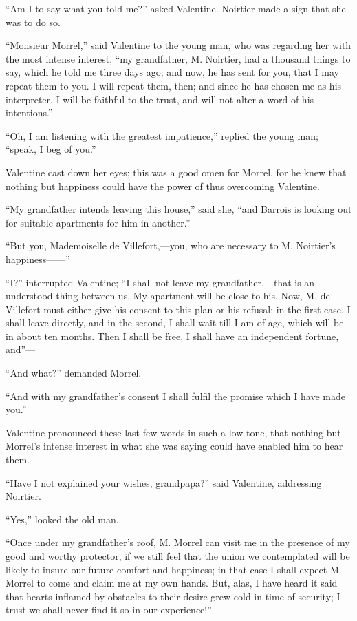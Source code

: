 “Am I to say what you told me?” asked Valentine. Noirtier made a sign
that she was to do so.

“Monsieur Morrel,” said Valentine to the young man, who was regarding
her with the most intense interest, “my grandfather, M. Noirtier, had a
thousand things to say, which he told me three days ago; and now, he
has sent for you, that I may repeat them to you. I will repeat them,
then; and since he has chosen me as his interpreter, I will be faithful
to the trust, and will not alter a word of his intentions.”

“Oh, I am listening with the greatest impatience,” replied the young
man; “speak, I beg of you.”

Valentine cast down her eyes; this was a good omen for Morrel, for he
knew that nothing but happiness could have the power of thus overcoming
Valentine.

“My grandfather intends leaving this house,” said she, “and Barrois is
looking out for suitable apartments for him in another.”

“But you, Mademoiselle de Villefort,—you, who are necessary to M.
Noirtier’s happiness——”

“I?” interrupted Valentine; “I shall not leave my grandfather,—that is
an understood thing between us. My apartment will be close to his. Now,
M. de Villefort must either give his consent to this plan or his
refusal; in the first case, I shall leave directly, and in the second,
I shall wait till I am of age, which will be in about ten months. Then
I shall be free, I shall have an independent fortune, and”—

“And what?” demanded Morrel.

“And with my grandfather’s consent I shall fulfil the promise which I
have made you.”

Valentine pronounced these last few words in such a low tone, that
nothing but Morrel’s intense interest in what she was saying could have
enabled him to hear them.

“Have I not explained your wishes, grandpapa?” said Valentine,
addressing Noirtier.

“Yes,” looked the old man.

“Once under my grandfather’s roof, M. Morrel can visit me in the
presence of my good and worthy protector, if we still feel that the
union we contemplated will be likely to insure our future comfort and
happiness; in that case I shall expect M. Morrel to come and claim me
at my own hands. But, alas, I have heard it said that hearts inflamed
by obstacles to their desire grew cold in time of security; I trust we
shall never find it so in our experience!”

